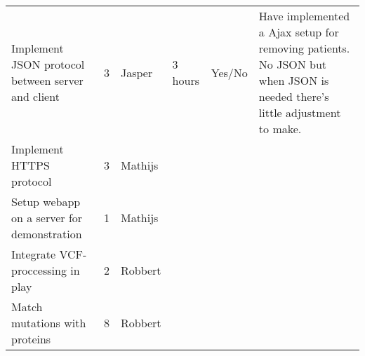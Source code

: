 \documentclass[a4paper]{report}
\begin{document}
\begin{landscape}
\begin{table}[ht]
\begin{tabular}{p{6cm}|l|l|l|p{2cm}|p{7cm}}
Implement JSON protocol between server and client & 3 & Jasper & 3 hours & Yes/No & Have implemented a Ajax setup for removing patients. No JSON but when JSON is needed there's little adjustment to make.\\
Implement HTTPS protocol & 3 & Mathijs & & & \\
Setup webapp on a server for demonstration & 1 & Mathijs & & & \\
Integrate VCF-proccessing in play & 2 & Robbert & & & \\
Match mutations with proteins & 8 & Robbert & & & \\
\end{tabular}
\end{table}
\end{landscape}
\end{document}
